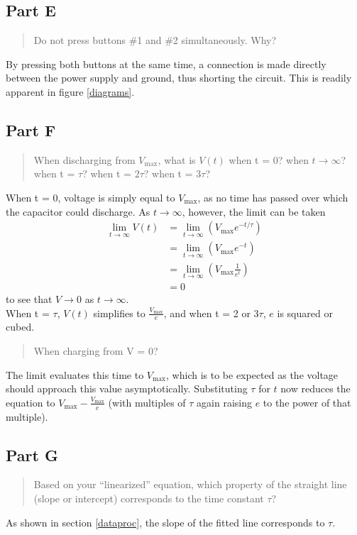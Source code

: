 \documentclass{article}
\begin{document}
	\subsection{Part E}
	\begin{quote}
		Do not press buttons \#1 and \#2 simultaneously. Why?
	\end{quote}
	By pressing both buttons at the same time, a connection is made directly between the power supply and ground, thus shorting the circuit. This is readily apparent in figure \ref{diagrams}.
	
	\subsection{Part F}
	\begin{quote}
		When discharging from $V_\mathrm{max}$, what is $V(t)$ when t = 0? when $t \to \infty$? when t = $\tau$? when t = $2\tau$? when t = $3\tau$?
	\end{quote}
	When t = 0, voltage is simply equal to $V_\mathrm{max}$, as no time has passed over which the capacitor could discharge. As $t\to\infty$, however, the limit can be taken
	\begin{align*}
		\lim_{t\to\infty}V(t) &= \lim_{t\to\infty}(V_\mathrm{max}e^{-t/\tau}) \\
			&= \lim_{t\to\infty}(V_\mathrm{max}e^{-t}) \\
			&= \lim_{t\to\infty}(V_\mathrm{max}\frac{1}{e^{t}}) \\
			&= 0
	\end{align*}
	to see that $V\to0$ as $t\to\infty$.\\
	When t = $\tau$, $V(t)$ simplifies to $\frac{V_\mathrm{max}}{e}$, and when t = 2 or 3$\tau$, $e$ is squared or cubed.\\
	
	\begin{quote}
		When charging from V = 0?
	\end{quote}
	The limit evaluates this time to $V_\mathrm{max}$, which is to be expected as the voltage should approach this value asymptotically.
	Substituting $\tau$ for $t$ now reduces the equation to $V_\mathrm{max} - \frac{V_\mathrm{max}}{e}$ (with multiples of $\tau$ again raising $e$ to the power of that multiple).

	\subsection{Part G}
	\begin{quote}
		Based on your “linearized” equation, which property of the straight line (slope or intercept) corresponds to the time constant $\tau$?
	\end{quote}
	As shown in section \ref{dataproc}, the slope of the fitted line corresponds to $\tau$.
\end{document}
